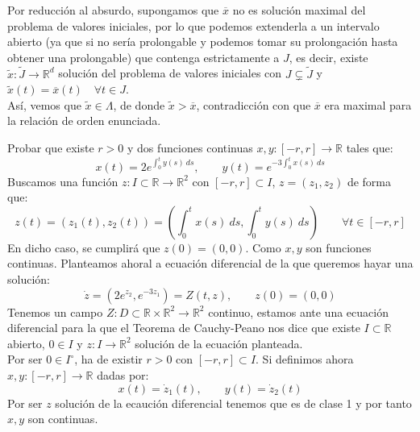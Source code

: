 \begin{ejercicio}
    \noindent
    Por reducción al absurdo, supongamos que $\overline{x}$ no es solución maximal del problema de valores iniciales, por lo que podemos extenderla a un intervalo abierto (ya que si no sería prolongable y podemos tomar su prolongación hasta obtener una prolongable) que contenga estrictamente a $J$, es decir, existe $\tilde{x}:\tilde{J}\to \mathbb{R}^d$ solución del problema de valores iniciales con $J\subsetneq \tilde{J}$ y $\tilde{x}(t) = \overline{x}(t) \quad \forall t\in J$.\\

    \noindent
    Así, vemos que $\tilde{x}\in \Lambda$, de donde $\tilde{x}>\overline{x}$, contradicción con que $\overline{x}$ era maximal para la relación de orden enunciada.
\end{ejercicio}

\begin{ejercicio}
    Probar que existe $r>0$ y dos funciones continuas $x,y:[-r,r]\to \mathbb{R}$ tales que:
    \begin{equation*}
        x(t) = 2e^{\int_{0}^{t} y(s)~ds }, \qquad y(t) = e^{-3\int_{0}^{t} x(s)~ds }
    \end{equation*}
    Buscamos una función $z:I\subset\mathbb{R}\to \mathbb{R}^2$ con $[-r,r]\subset I$, $z=(z_1,z_2)$ de forma que:
    \begin{equation*}
        z(t) = (z_1(t), z_2(t)) = \left(\int_{0}^{t} x(s)~ds, \int_{0}^{t} y(s)~ds  \right) \qquad \forall t\in [-r,r]
    \end{equation*}
    En dicho caso, se cumplirá que $z(0) = (0, 0)$. Como $x,y$ son funciones continuas. Planteamos ahoral a ecuación diferencial de la que queremos hayar una solución:
    \begin{equation*}
        \dot{z} = (2e^{z_2}, e^{-3z_1}) = Z(t,z), \qquad z(0) = (0,0)
    \end{equation*}
    Tenemos un campo $Z:D\subset \mathbb{R}\times\mathbb{R}^2\to \mathbb{R}^2$ continuo, estamos ante una ecuación diferencial para la que el Teorema de Cauchy-Peano nos dice que existe $I\subset \mathbb{R}$ abierto, $0\in I$ y $z:I\to \mathbb{R}^2$ solución de la ecuación planteada.\\

    \noindent
    Por ser $0\in I^\circ$, ha de existir $r>0$ con $[-r,r]\subset I$. Si definimos ahora $x,y:[-r,r]\to \mathbb{R}$ dadas por:
    \begin{equation*}
        x(t) = \dot{z}_1(t), \qquad y(t) = \dot{z}_2(t)
    \end{equation*}
    Por ser $z$ solución de la ecaución diferencial tenemos que es de clase 1 y por tanto $x,y$ son continuas.
\end{ejercicio}


